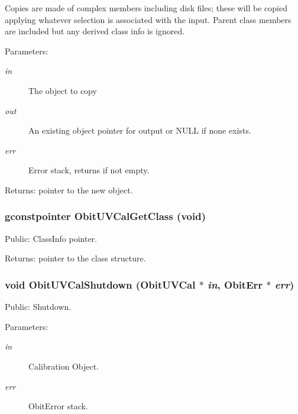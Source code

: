 Copies are made of complex members including disk files; these will be copied applying whatever selection is associated with the input. Parent class members are included but any derived class info is ignored. \begin{Desc}
\item[Parameters:]
\begin{description}
\item[{\em in}]The object to copy \item[{\em out}]An existing object pointer for output or NULL if none exists. \item[{\em err}]Error stack, returns if not empty. \end{description}
\end{Desc}
\begin{Desc}
\item[Returns:]pointer to the new object. \end{Desc}
\subsubsection{\setlength{\rightskip}{0pt plus 5cm}gconstpointer Obit\-UVCal\-Get\-Class (void)}\label{ObitUVCal_8h_a10}


Public: Class\-Info pointer. 

\begin{Desc}
\item[Returns:]pointer to the class structure. \end{Desc}
\subsubsection{\setlength{\rightskip}{0pt plus 5cm}void Obit\-UVCal\-Shutdown ({\bf Obit\-UVCal} $\ast$ {\em in}, {\bf Obit\-Err} $\ast$ {\em err})}\label{ObitUVCal_8h_a15}


Public: Shutdown. 

\begin{Desc}
\item[Parameters:]
\begin{description}
\item[{\em in}]Calibration Object. \item[{\em err}]Obit\-Error stack. \end{description}
\end{Desc}
